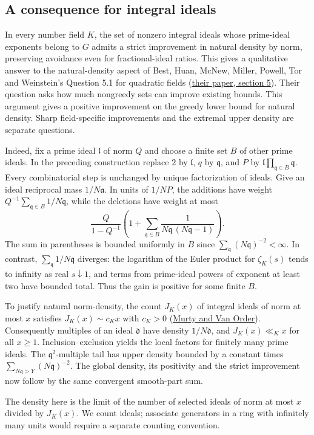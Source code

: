 \subsection*{A consequence for integral ideals}
In every number field $K$, the set of nonzero integral ideals whose
prime-ideal exponents belong to $G$ admits a strict improvement in
natural density by norm, preserving avoidance even for fractional-ideal
ratios. This gives a qualitative answer to the natural-density aspect
of Best, Huan, McNew, Miller, Powell, Tor and Weinstein's Question 5.1
for quadratic fields
(\href{https://arxiv.org/abs/1412.0999}{their paper, section 5}).
Their question asks how much nongreedy sets can improve existing bounds.
This argument gives a positive improvement on the greedy lower bound
for natural density. Sharp field-specific improvements and the extremal
upper density are separate questions.

Indeed, fix a prime ideal $\mathfrak l$ of norm $Q$ and choose a finite
set $B$ of other prime ideals. In the preceding construction replace
$2$ by $\mathfrak l$, $q$ by $\mathfrak q$, and $P$ by
$\mathfrak l\prod_{\mathfrak q\in B}\mathfrak q$. Every combinatorial
step is unchanged by unique factorization of ideals. Give an ideal
reciprocal mass $1/N\mathfrak a$. In units of $1/NP$, the additions
have weight $Q^{-1}\sum_{\mathfrak q\in B}1/N\mathfrak q$, while the
deletions have weight at most
\[
  \frac{Q}{1-Q^{-1}}
  \left(1+\sum_{\mathfrak q\in B}
    \frac1{N\mathfrak q\,(N\mathfrak q-1)}\right).
\]
The sum in parentheses is bounded uniformly in $B$ since
$\sum_{\mathfrak q}(N\mathfrak q)^{-2}<\infty$.
In contrast, $\sum_{\mathfrak q}1/N\mathfrak q$ diverges:
the logarithm of the Euler product for $\zeta_K(s)$ tends to infinity
as real $s\downarrow1$, and terms from prime-ideal powers of exponent
at least two have bounded total. Thus the gain is positive for some
finite $B$.

To justify natural norm-density, the count $J_K(x)$ of integral ideals
of norm at most $x$ satisfies $J_K(x)\sim c_Kx$ with $c_K>0$
(\href{https://doi.org/10.1016/j.exmath.2006.08.001}{Murty and Van Order}).
Consequently multiples of an ideal $\mathfrak d$ have density
$1/N\mathfrak d$, and $J_K(x)\ll_K x$ for all $x\ge1$.
Inclusion--exclusion yields the local factors for finitely many prime
ideals. The $\mathfrak q^2$-multiple tail has upper density bounded
by a constant times $\sum_{N\mathfrak q>Y}(N\mathfrak q)^{-2}$.
The global density, its positivity and the strict improvement now
follow by the same convergent smooth-part sum.

The density here is the limit of the number of selected ideals of norm at most $x$ divided by $J_K(x)$. We count ideals; associate generators in a ring with infinitely many units would require a separate counting convention.
